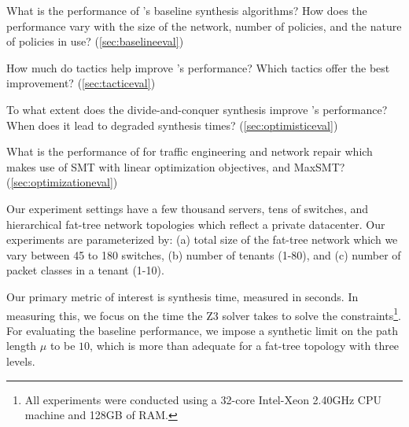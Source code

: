\begin{compactitemize}

\item What is the performance of \Name's baseline synthesis
  algorithms? How does the performance vary with the size of the
  network, number of policies, and the nature of policies in use? (\cref{sec:baselineeval})

\item How much do tactics help improve \Name's 
  performance? Which tactics offer the best improvement? (\cref{sec:tacticeval})

\item To what extent does the divide-and-conquer synthesis improve \Name's
  performance? When does it lead to degraded synthesis times? (\cref{sec:optimisticeval})

\item What is the performance of \name for traffic engineering and network repair
which makes use of SMT with linear optimization objectives, and MaxSMT? (\cref{sec:optimizationeval})

\end{compactitemize}
Our experiment settings have a few thousand servers, tens of switches,
and hierarchical fat-tree network topologies which reflect a private
datacenter. Our experiments are parameterized by: (a) total size of
the fat-tree network which we vary between 45 to 180 switches, (b) number of
tenants (1-80), and (c) number of packet classes in a tenant (1-10).

Our primary metric of interest is synthesis time, measured in
seconds. In measuring this, we focus on the time the Z3 solver takes
to solve the constraints\footnote{All experiments were conducted using a
	32-core Intel-Xeon 2.40GHz CPU machine and
	128GB of RAM.}. For evaluating the baseline performance, we impose a
synthetic limit on the path length $\mu$ to be $10$, which is more than adequate 
for a fat-tree topology with three levels. 

